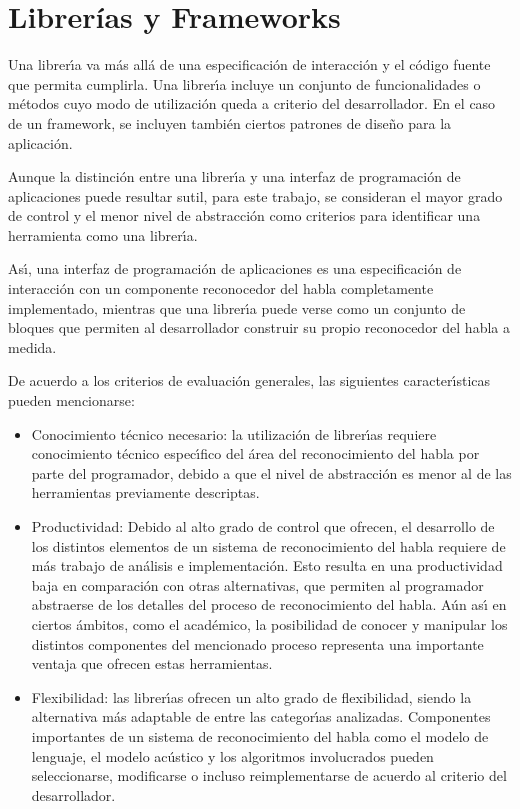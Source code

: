 \section{Librer\'ias y Frameworks}
\label{sec:librerias}

Una librer{\'\i}a va m\'as all\'a de una especificaci\'on de interacci\'on y el c\'odigo fuente que permita cumplirla.
Una librer{\'\i}a incluye un conjunto de funcionalidades o m\'etodos cuyo modo de utilizaci\'on queda a criterio
del desarrollador. En el caso de un framework, se incluyen tambi\'en ciertos patrones de dise\~no para la aplicaci\'on.

Aunque la distinci\'on entre una librer{\'\i}a y una interfaz de programaci\'on de aplicaciones puede resultar
sutil, para este trabajo, se consideran el mayor grado de control y el menor nivel de abstracci\'on
como criterios para identificar una herramienta como una librer{\'\i}a.

As{\'\i}, una interfaz de programaci\'on de aplicaciones es una especificaci\'on de interacci\'on con un componente
reconocedor del habla completamente implementado, mientras que una librer{\'\i}a puede verse como un conjunto
de bloques que permiten al desarrollador construir su propio reconocedor del habla a medida.

De acuerdo a los criterios de evaluaci\'on generales, las siguientes caracter{\'\i}sticas pueden mencionarse:

\begin{itemize}
 	\item Conocimiento t\'ecnico necesario: la utilizaci\'on de librer{\'\i}as requiere conocimiento t\'ecnico
 	espec{\'\i}fico del \'area del reconocimiento del habla por parte del programador, debido a que el nivel de
 	abstracci\'on es menor al de las herramientas previamente descriptas.
 	\item Productividad: Debido al alto grado de control que ofrecen, el desarrollo de los distintos
 	elementos de un sistema de reconocimiento del habla requiere de m\'as trabajo de an\'alisis e implementaci\'on.
 	Esto resulta en una productividad baja en comparaci\'on con otras alternativas, que permiten al
 	programador abstraerse de los detalles del proceso de reconocimiento del habla.
 	A\'un as{\'\i} en ciertos \'ambitos, como el acad\'emico, la posibilidad de conocer y manipular los distintos
 	componentes del mencionado proceso representa una importante ventaja que ofrecen estas herramientas.
 	\item Flexibilidad: las librer{\'\i}as ofrecen un alto grado de flexibilidad, siendo la alternativa
 	m\'as adaptable de entre las categor{\'\i}as analizadas. Componentes importantes de un sistema
 	de reconocimiento del habla como el modelo de lenguaje, el modelo ac\'ustico y los algoritmos involucrados
 	pueden seleccionarse, modificarse o incluso reimplementarse de acuerdo al criterio del desarrollador.
 \end{itemize}


